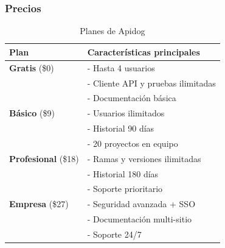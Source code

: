 \documentclass[man, floatsintext]{apa7}
\begin{document}
	\subsubsection{Precios}

\begin{table}[h!]
	\centering
	\caption{Planes de Apidog }
	\begin{tabular}{|p{3cm}|p{10cm}|}
		\hline
		\textbf{Plan} & \textbf{Características principales} \\
		\hline
		\textbf{Gratis} (\$0) &
		- Hasta 4 usuarios \\
		& - Cliente API y pruebas ilimitadas \\
		& - Documentación básica \\
		\hline
		\textbf{Básico} (\$9) &
		- Usuarios ilimitados \\
		& - Historial 90 días \\
		& - 20 proyectos en equipo \\
		\hline
		\textbf{Profesional} (\$18) &
		- Ramas y versiones ilimitadas \\
		& - Historial 180 días \\
		& - Soporte prioritario \\
		\hline
		\textbf{Empresa} (\$27) &
		- Seguridad avanzada + SSO \\
		& - Documentación multi-sitio \\
		& - Soporte 24/7 \\
		\hline
	\end{tabular}
\end{table}
\FloatBarrier
	
\end{document}
